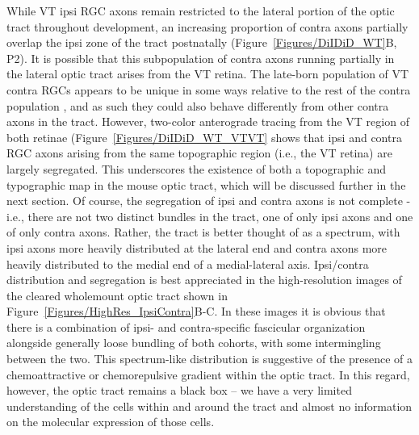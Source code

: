 While VT ipsi RGC axons remain restricted to the lateral portion of the optic tract throughout development, an increasing proportion of contra axons partially overlap the ipsi zone of the tract postnatally (Figure~\ref{Figures/DiIDiD_WT}B, P2).
It is possible that this subpopulation of contra axons running partially in the lateral optic tract arises from the VT retina.
The late-born population of VT contra RGCs appears to be unique in some ways relative to the rest of the contra population \cite{williams2006role}, and as such they could also behave differently from other contra axons in the tract.
However, two-color anterograde tracing from the VT region of both retinae (Figure~\ref{Figures/DiIDiD_WT_VTVT} shows that ipsi and contra RGC axons arising from the same topographic region (i.e., the VT retina) are largely segregated.
This underscores the existence of both a topographic and typographic map in the mouse optic tract, which will be discussed further in the next section.
Of course, the segregation of ipsi and contra axons is not complete - i.e., there are not two distinct bundles in the tract, one of only ipsi axons and one of only contra axons.
Rather, the tract is better thought of as a spectrum, with ipsi axons more heavily distributed at the lateral end and contra axons more heavily distributed to the medial end of a medial-lateral axis.
Ipsi/contra distribution and segregation is best appreciated in the high-resolution images of the cleared wholemount optic tract shown in Figure~\ref{Figures/HighRes_IpsiContra}B-C.
In these images it is obvious that there is a combination of ipsi- and contra-specific fascicular organization alongside generally loose bundling of both cohorts, with some intermingling between the two.
This spectrum-like distribution is suggestive of the presence of a chemoattractive or chemorepulsive gradient within the optic tract.
In this regard, however, the optic tract remains a black box -- we have a very limited understanding of the cells within and around the tract and almost no information on the molecular expression of those cells.


